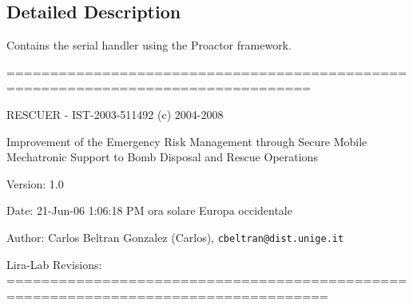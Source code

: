 \subsection{Detailed Description}
Contains the serial handler using the Proactor framework. 

=================================================================================

RESCUER - IST-2003-511492 (c) 2004-2008

Improvement of the Emergency Risk Management through Secure Mobile Mechatronic Support to Bomb Disposal and Rescue Operations

\begin{Desc}
\item[Version:]1.0 \end{Desc}
\begin{Desc}
\item[Date:]21-Jun-06 1:06:18 PM ora solare Europa occidentale \end{Desc}
\begin{Desc}
\item[Author:]Carlos Beltran Gonzalez (Carlos), {\tt cbeltran@dist.unige.it} 

Lira-Lab Revisions: ===================================================================================\end{Desc}
